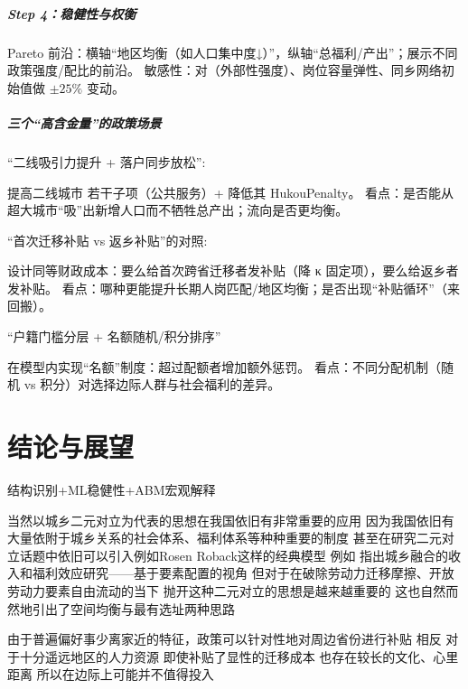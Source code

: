 \documentclass[
  a4paper,
  zihao=-4,
  fontset=mac,
  AutoFakeBold,
  AutoFakeSlant,
  oneside]{ctexbook}
\begin{document}
\paragraph{Step 4：稳健性与权衡}

Pareto 前沿：横轴“地区均衡（如人口集中度↓）”，纵轴“总福利/产出”；展示不同政策强度/配比的前沿。
敏感性：对（外部性强度）、岗位容量弹性、同乡网络初始值做 $\pm 25\%$ 变动。

\paragraph{三个“高含金量”的政策场景}

“二线吸引力提升 + 落户同步放松”:

提高二线城市  若干子项（公共服务）+ 降低其 HukouPenalty。
看点：是否能从超大城市“吸”出新增人口而不牺牲总产出；流向是否更均衡。

“首次迁移补贴 vs 返乡补贴”的对照:

设计同等财政成本：要么给首次跨省迁移者发补贴（降 
κ 固定项），要么给返乡者发补贴。
看点：哪种更能提升长期人岗匹配/地区均衡；是否出现“补贴循环”（来回搬）。

“户籍门槛分层 + 名额随机/积分排序”

在模型内实现“名额”制度：超过配额者增加额外惩罚。
看点：不同分配机制（随机 vs 积分）对选择边际人群与社会福利的差异。







\chapter{结论与展望}

结构识别+ML稳健性+ABM宏观解释


当然以城乡二元对立为代表的思想在我国依旧有非常重要的应用 因为我国依旧有大量依附于城乡关系的社会体系、福利体系等种种重要的制度
甚至在研究二元对立话题中依旧可以引入例如Rosen Roback这样的经典模型
例如 
\textcite{GuoDongMeiChengXiangRongHeDeShouRuHeFuLiXiaoYingYanJiuJiYuYaoSuPeiZhiDeShiJiao2023}指出城乡融合的收入和福利效应研究——基于要素配置的视角
但对于在破除劳动力迁移摩擦、开放劳动力要素自由流动的当下
抛开这种二元对立的思想是越来越重要的
这也自然而然地引出了空间均衡与最有选址两种思路



由于普遍偏好事少离家近的特征，政策可以针对性地对周边省份进行补贴
相反 对于十分遥远地区的人力资源 即使补贴了显性的迁移成本 也存在较长的文化、心里距离 所以在边际上可能并不值得投入
\end{document}
